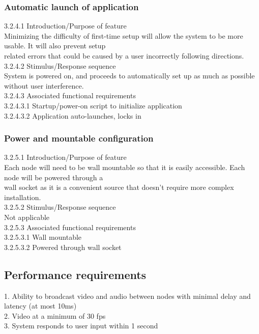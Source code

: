 \documentclass[onecolumn, draftclsnofoot,10pt, compsoc]{IEEEtran}
\newcommand\tab[1][1cm]{\hspace*{#1}}
\begin{document}
\subsubsection{Automatic launch of application}
\tab 3.2.4.1  Introduction/Purpose of feature \\
\tab Minimizing the difficulty of first-time setup will allow the system to be more usable. It will also prevent setup \\ \tab related errors that could be caused by a user incorrectly following directions. \\
\tab 3.2.4.2  Stimulus/Response sequence \\
\tab System is powered on, and proceeds to automatically set up as much as possible without user interference. \\
\tab 3.2.4.3  Associated functional requirements \\
\tab \tab 3.2.4.3.1  Startup/power-on script to initialize application \\
\tab \tab 3.2.4.3.2  Application auto-launches, locks in 

\subsubsection{Power and mountable configuration}
\tab 3.2.5.1  Introduction/Purpose of feature \\
\tab Each node will need to be wall mountable so that it is easily accessible. Each node will be powered through a \\ \tab wall socket as it is a convenient source that doesn’t require more complex installation. \\
\tab 3.2.5.2  Stimulus/Response sequence \\
\tab Not applicable \\ 
\tab 3.2.5.3  Associated functional requirements \\
\tab \tab 3.2.5.3.1  Wall mountable \\
\tab \tab 3.2.5.3.2  Powered through wall socket

\subsection{Performance requirements}
1. Ability to broadcast video and audio between nodes with minimal delay and latency (at most 10ms) \\
2. Video at a minimum of 30 fps \\ %
3. System responds to user input within 1 second
\end{document}
